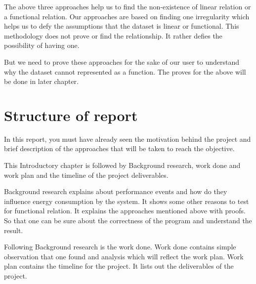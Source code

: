 The above three approaches help us to find the non-existence of linear relation or a functional relation. Our approaches are based on finding one irregularity which helps us to defy the assumptions that the dataset is linear or functional. This methodology does not prove or find the relationship. It rather defies the possibility of having one.

But we need to prove these approaches for the sake of our user to understand why the dataset cannot represented as a function. The proves for the above will be done in later chapter.

\section{Structure of report}
In this report, you must have already seen the motivation behind the project and brief description of the approaches that will be taken to reach the objective.

This Introductory chapter is followed by Background research, work done and work plan and the timeline of the project deliverables.

Background research explains about performance events and how do they influence energy consumption by the system. It shows some other reasons to test for functional relation. It explains the approaches mentioned above with proofs. So that one can be sure about the correctness of the program and understand the result. 

Following Background research is the work done. Work done contains simple observation that one found and analysis which will reflect the work plan. Work plan contains the timeline for the project. It lists out the deliverables of the project.